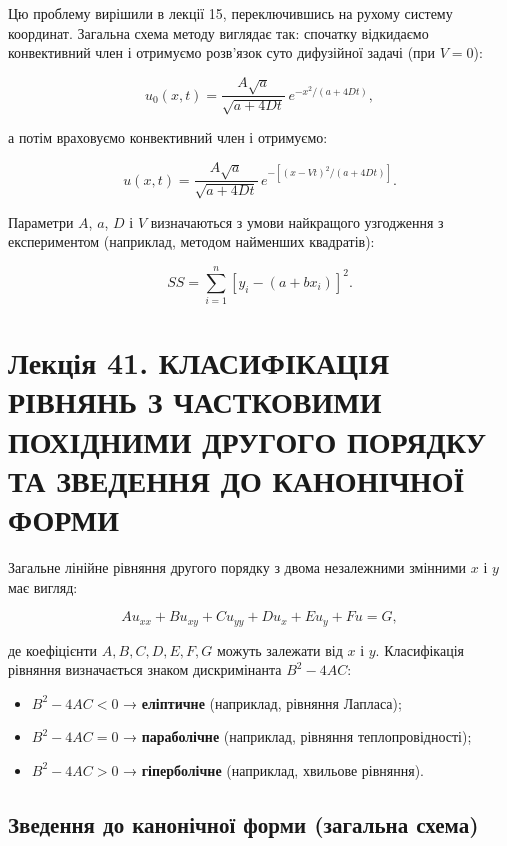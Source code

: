 \documentclass[
  ukrainian,
]{article}
\providecommand{\tightlist}{%
  \setlength{\itemsep}{0pt}\setlength{\parskip}{0pt}}
\begin{document}
Цю проблему вирішили в лекції 15, переключившись на рухому систему
координат. Загальна схема методу виглядає так: спочатку відкидаємо
конвективний член і отримуємо розв'язок суто дифузійної задачі (при
\(V = 0\)):

\[
u_0(x, t) = \frac{A\sqrt{a}}{\sqrt{a+4Dt}}\, e^{-x^2/(a+4Dt)},
\]

а потім враховуємо конвективний член і отримуємо:

\[
u(x, t) = \frac{A\sqrt{a}}{\sqrt{a+4Dt}}\, e^{-[(x-Vt)^{2}/(a+4Dt)]}.
\]

Параметри \(A\), \(a\), \(D\) і \(V\) визначаються з умови найкращого
узгодження з експериментом (наприклад, методом найменших квадратів):

\[
SS = \sum_{i=1}^{n} [y_i - (a + bx_i)]^2.
\]

\section{Лекція 41. КЛАСИФІКАЦІЯ РІВНЯНЬ З ЧАСТКОВИМИ ПОХІДНИМИ ДРУГОГО
ПОРЯДКУ ТА ЗВЕДЕННЯ ДО КАНОНІЧНОЇ
ФОРМИ}\label{ux43bux435ux43aux446ux456ux44f-41.-ux43aux43bux430ux441ux438ux444ux456ux43aux430ux446ux456ux44f-ux440ux456ux432ux43dux44fux43dux44c-ux437-ux447ux430ux441ux442ux43aux43eux432ux438ux43cux438-ux43fux43eux445ux456ux434ux43dux438ux43cux438-ux434ux440ux443ux433ux43eux433ux43e-ux43fux43eux440ux44fux434ux43aux443-ux442ux430-ux437ux432ux435ux434ux435ux43dux43dux44f-ux434ux43e-ux43aux430ux43dux43eux43dux456ux447ux43dux43eux457-ux444ux43eux440ux43cux438}

Загальне лінійне рівняння другого порядку з двома незалежними змінними
\(x\) і \(y\) має вигляд:

\[
A u_{xx} + B u_{xy} + C u_{yy} + D u_x + E u_y + F u = G,
\]

де коефіцієнти \(A, B, C, D, E, F, G\) можуть залежати від \(x\) і
\(y\). Класифікація рівняння визначається знаком дискримінанта
\(B^2 - 4AC\):

\begin{itemize}
\tightlist
\item
  \(B^2 - 4AC < 0\) → \textbf{еліптичне} (наприклад, рівняння Лапласа);
\item
  \(B^2 - 4AC = 0\) → \textbf{параболічне} (наприклад, рівняння
  теплопровідності);
\item
  \(B^2 - 4AC > 0\) → \textbf{гіперболічне} (наприклад, хвильове
  рівняння).
\end{itemize}

\subsection{Зведення до канонічної форми (загальна
схема)}\label{ux437ux432ux435ux434ux435ux43dux43dux44f-ux434ux43e-ux43aux430ux43dux43eux43dux456ux447ux43dux43eux457-ux444ux43eux440ux43cux438-ux437ux430ux433ux430ux43bux44cux43dux430-ux441ux445ux435ux43cux430}
\end{document}

